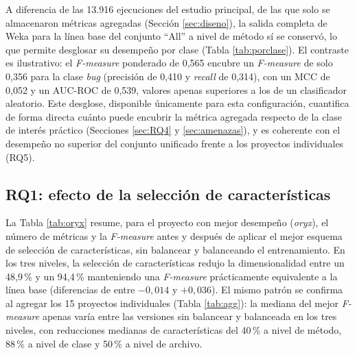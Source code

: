 \documentclass[conference,a4paper]{IEEEtran}
\begin{document}
A diferencia de las 13.916 ejecuciones del estudio principal, de las que solo se almacenaron métricas agregadas (Sección \ref{sec:diseno}), la salida completa de Weka para la línea base del conjunto ``All'' a nivel de método sí se conservó, lo que permite desglosar su desempeño por clase (Tabla \ref{tab:porclase}). El contraste es ilustrativo: el \textit{F-measure} ponderado de 0,565 encubre un \textit{F-measure} de solo 0,356 para la clase \textit{bug} (precisión de 0,410 y \textit{recall} de 0,314), con un MCC de 0,052 y un AUC-ROC de 0,539, valores apenas superiores a los de un clasificador aleatorio. Este desglose, disponible únicamente para esta configuración, cuantifica de forma directa cuánto puede encubrir la métrica agregada respecto de la clase de interés práctico (Secciones \ref{sec:RQ4} y \ref{sec:amenazas}), y es coherente con el desempeño no superior del conjunto unificado frente a los proyectos individuales (RQ5).

\begin{table}[H]
\caption{Desglose por clase de la línea base (Weka, Random Forest, validación cruzada de 10 particiones) sobre el conjunto ``All'' a nivel de método}
\label{tab:porclase}
\centering
{}
\end{table}

\subsection{RQ1: efecto de la selección de características}
\label{sec:RQ1}

La Tabla \ref{tab:oryx} resume, para el proyecto con mejor desempeño (\textit{oryx}), el número de métricas y la \textit{F-measure} antes y después de aplicar el mejor esquema de selección de características, sin balancear y balanceando el entrenamiento. En los tres niveles, la selección de características redujo la dimensionalidad entre un 48,9\,\% y un 94,4\,\% manteniendo una \textit{F-measure} prácticamente equivalente a la línea base (diferencias de entre $-0{,}014$ y $+0{,}036$). El mismo patrón se confirma al agregar los 15 proyectos individuales (Tabla \ref{tab:agg}): la mediana del mejor \textit{F-measure} apenas varía entre las versiones sin balancear y balanceada en los tres niveles, con reducciones medianas de características del 40\,\% a nivel de método, 88\,\% a nivel de clase y 50\,\% a nivel de archivo.
\end{document}
